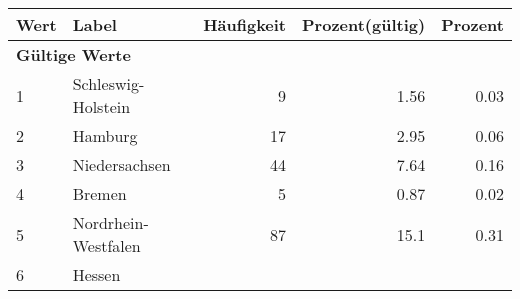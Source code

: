      \begin{longtable}{lXrrr}
     \toprule
     \textbf{Wert} & \textbf{Label} & \textbf{Häufigkeit} & \textbf{Prozent(gültig)} & \textbf{Prozent} \\
     \endhead
     \midrule
     \multicolumn{5}{l}{\textbf{Gültige Werte}}\\

     1 &
     \multicolumn{1}{X}{ Schleswig-Holstein   } &


       \num{9} &
       \num[round-mode=places,round-precision=2]{1.56} &
         \num[round-mode=places,round-precision=2]{0.03} \\

     2 &
     \multicolumn{1}{X}{ Hamburg   } &


       \num{17} &
       \num[round-mode=places,round-precision=2]{2.95} &
         \num[round-mode=places,round-precision=2]{0.06} \\

     3 &
     \multicolumn{1}{X}{ Niedersachsen   } &


       \num{44} &
       \num[round-mode=places,round-precision=2]{7.64} &
         \num[round-mode=places,round-precision=2]{0.16} \\

     4 &
     \multicolumn{1}{X}{ Bremen   } &


       \num{5} &
       \num[round-mode=places,round-precision=2]{0.87} &
         \num[round-mode=places,round-precision=2]{0.02} \\

     5 &
     \multicolumn{1}{X}{ Nordrhein-Westfalen   } &


       \num{87} &
       \num[round-mode=places,round-precision=2]{15.1} &
         \num[round-mode=places,round-precision=2]{0.31} \\

     6 &
     \multicolumn{1}{X}{ Hessen   } &



\end{longtable}
